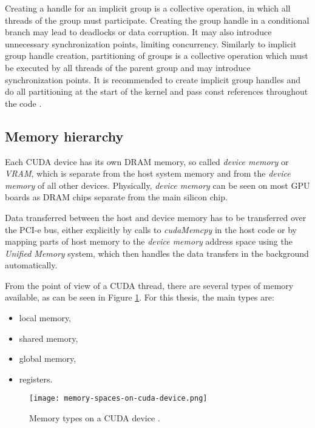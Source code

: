 

Creating a handle for an implicit group is a collective operation, in which all threads of the group must participate. Creating the group handle in a conditional branch may lead to deadlocks or data corruption. It may also introduce unnecessary synchronization points, limiting concurrency. Similarly to implicit group handle creation, partitioning of groups is a collective operation which must be executed by all threads of the parent group and may introduce synchronization points. It is recommended to create implicit group handles and do all partitioning at the start of the kernel and pass const references throughout the code \cite{site:cuda}.

\subsection{Memory hierarchy}
\label{sec:memory_hierarchy}

Each CUDA device has its own DRAM memory, so called \textit{device memory} or \textit{VRAM}, which is separate from the host system memory and from the \textit{device memory} of all other devices. Physically, \textit{device memory} can be seen on most GPU boards as DRAM chips separate from the main silicon chip.

Data transferred between the host and device memory has to be transferred over the PCI-e bus, either explicitly by calls to \textit{cudaMemcpy} in the host code or by mapping parts of host memory to the \textit{device memory} address space using the \textit{Unified Memory} system, which then handles the data transfers in the background automatically.

From the point of view of a CUDA thread, there are several types of memory available, as can be seen in Figure \ref{fig:memory_types}. For this thesis, the main types are:

\begin{itemize}
	\item local memory,
	\item shared memory,
	\item global memory,
	\item registers.
\end{itemize}

\begin{figure}[ht]
	\centering
	\texttt{[image: memory-spaces-on-cuda-device.png]}
	\caption{Memory types on a CUDA device \citep{site:cuda}.}
	\label{fig:memory_types}
\end{figure}

